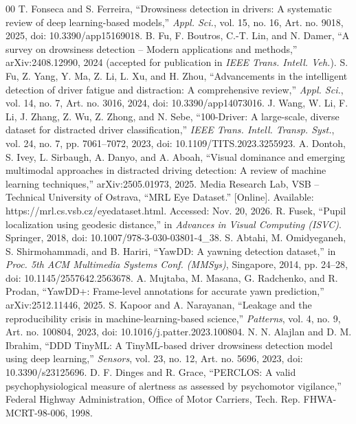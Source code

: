 \documentclass[conference]{IEEEtran}
\begin{document}
\vspace{0.2cm}
\begin{thebibliography}{00}
 T. Fonseca and S. Ferreira, ``Drowsiness detection in drivers: A systematic review of deep learning-based models,'' \emph{Appl. Sci.}, vol. 15, no. 16, Art. no. 9018, 2025, doi: 10.3390/app15169018. 
 B. Fu, F. Boutros, C.-T. Lin, and N. Damer, ``A survey on drowsiness detection -- Modern applications and methods,'' arXiv:2408.12990, 2024 (accepted for publication in \emph{IEEE Trans. Intell. Veh.}).
 S. Fu, Z. Yang, Y. Ma, Z. Li, L. Xu, and H. Zhou, ``Advancements in the intelligent detection of driver fatigue and distraction: A comprehensive review,'' \emph{Appl. Sci.}, vol. 14, no. 7, Art. no. 3016, 2024, doi: 10.3390/app14073016.
 J. Wang, W. Li, F. Li, J. Zhang, Z. Wu, Z. Zhong, and N. Sebe, ``100-Driver: A large-scale, diverse dataset for distracted driver classification,'' \emph{IEEE Trans. Intell. Transp. Syst.}, vol. 24, no. 7, pp. 7061--7072, 2023, doi: 10.1109/TITS.2023.3255923.
 A. Dontoh, S. Ivey, L. Sirbaugh, A. Danyo, and A. Aboah, ``Visual dominance and emerging multimodal approaches in distracted driving detection: A review of machine learning techniques,'' arXiv:2505.01973, 2025. 
 Media Research Lab, VSB -- Technical University of Ostrava, ``MRL Eye Dataset.'' [Online]. Available: https://mrl.cs.vsb.cz/eyedataset.html. Accessed: Nov. 20, 2026.
 R. Fusek, ``Pupil localization using geodesic distance,'' in \emph{Advances in Visual Computing (ISVC)}. Springer, 2018, doi: 10.1007/978-3-030-03801-4\_38. 
 S. Abtahi, M. Omidyeganeh, S. Shirmohammadi, and B. Hariri, ``YawDD: A yawning detection dataset,'' in \emph{Proc. 5th ACM Multimedia Systems Conf. (MMSys)}, Singapore, 2014, pp. 24--28, doi: 10.1145/2557642.2563678.
 A. Mujtaba, M. Masana, G. Radchenko, and R. Prodan, ``YawDD+: Frame-level annotations for accurate yawn prediction,'' arXiv:2512.11446, 2025.
 S. Kapoor and A. Narayanan, ``Leakage and the reproducibility crisis in machine-learning-based science,'' \emph{Patterns}, vol. 4, no. 9, Art. no. 100804, 2023, doi: 10.1016/j.patter.2023.100804. 
 N. N. Alajlan and D. M. Ibrahim, ``DDD TinyML: A TinyML-based driver drowsiness detection model using deep learning,'' \emph{Sensors}, vol. 23, no. 12, Art. no. 5696, 2023, doi: 10.3390/s23125696. 
 D. F. Dinges and R. Grace, ``PERCLOS: A valid psychophysiological measure of alertness as assessed by psychomotor vigilance,'' Federal Highway Administration, Office of Motor Carriers, Tech. Rep. FHWA-MCRT-98-006, 1998. 

\end{thebibliography}
\end{document}
